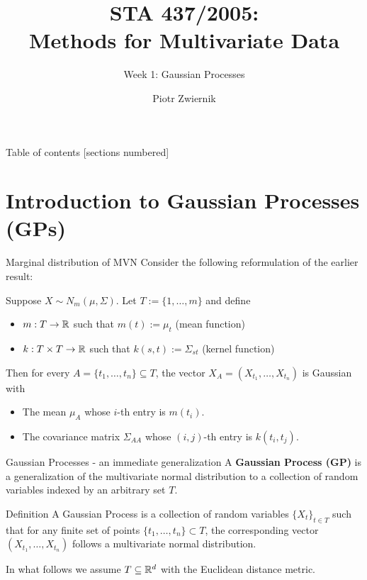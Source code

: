 \documentclass[11pt,handout,aspectratio=169]{beamer}
\title[STA437-Week1]{STA 437/2005: \\ Methods for Multivariate Data}
\subtitle[]{Week 1: Gaussian Processes}
\author[Piotr Zwiernik]{Piotr Zwiernik}
\institute[UofT]{University of Toronto}
\date{}
\begin{document}
\maketitle

\begin{frame}{Table of contents}
[sections numbered]
\tableofcontents%
\end{frame}

\section{Introduction to Gaussian Processes (GPs)}

\begin{frame}{Marginal distribution of MVN}
Consider the following reformulation of the earlier result:

Suppose $X\sim N_m(\mu,\Sigma)$. Let \alert{$T:=\{1,\ldots,m\}$} and define
\begin{itemize}
	\item  $m:T \to \mathbb R$ such that $m(t):=\mu_t$ (mean function)
	\item $k:T\times T\to \mathbb R$ such that $k(s,t):=\Sigma_{st}$ (kernel function)
\end{itemize}

Then for every $A=\{t_1,\ldots,t_n\}\subseteq T$, the vector $X_A=(X_{t_1},\ldots,X_{t_n})$ is Gaussian with
\begin{itemize}
	\item The mean $\mu_A$ whose $i$-th entry is $m(t_i)$.
	\item The covariance matrix $\Sigma_{AA}$ whose $(i,j)$-th entry is $k(t_i,t_j)$.
\end{itemize} 
\end{frame}

\begin{frame}{Gaussian Processes - an immediate generalization}
A \textbf{Gaussian Process (GP)} is a generalization of the multivariate normal distribution to a collection of random variables indexed by an \alert{arbitrary} set \( T \).

\begin{alertblock}{Definition}
A Gaussian Process is a collection of random variables $\{X_t\}_{t\in T}$ such that for any finite set of points \( \{t_1, \dots, t_n\} \subset T \), the corresponding vector \( (X_{t_1}, \dots, X_{t_n}) \) follows a multivariate normal distribution.
\end{alertblock}

In what follows we assume $T\subseteq \mathbb R^d$ with the Euclidean distance metric.
\end{frame}
\end{document}

